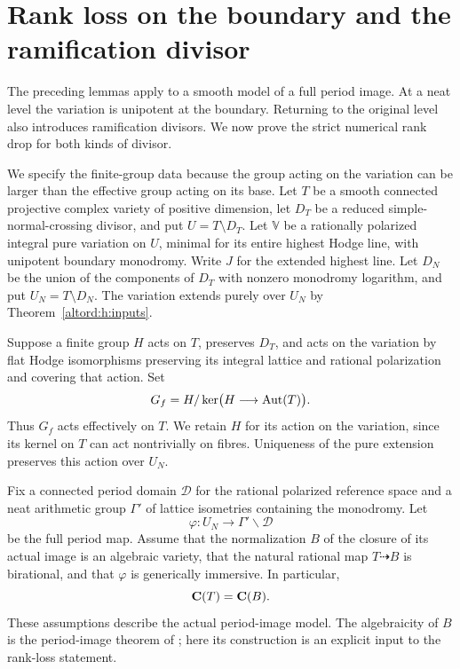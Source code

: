 \section{Rank loss on the boundary and the ramification divisor}
\label{sec:rankloss}

The preceding lemmas apply to a smooth model of a full period image.
At a neat level the variation is unipotent at the boundary. Returning
to the original level also introduces ramification divisors. We now
prove the strict numerical rank drop for both kinds of divisor.

We specify the finite-group data because the group acting on the
variation can be larger than the effective group acting on its base.
Let $T$ be a smooth connected projective complex variety of positive
dimension, let $D_T$ be a reduced simple-normal-crossing divisor, and
put $U=T\setminus D_T$. Let $\mathbb V$ be a rationally polarized
integral pure variation on $U$, minimal for its entire highest
Hodge line, with unipotent boundary monodromy. Write $J$ for the
extended highest line. Let $D_N$ be the union of the components
of $D_T$ with nonzero monodromy logarithm, and put
$U_N=T\setminus D_N$. The variation extends purely over $U_N$ by
Theorem~\ref{altord:h:inputs}.

Suppose a finite group $H$ acts on $T$, preserves $D_T$, and acts on
the variation by flat Hodge isomorphisms preserving its integral
lattice and rational polarization and covering that action. Set
\[
                 G_f=H/\ker\bigl(H\longrightarrow\operatorname{Aut}(T)\bigr).
\]
Thus $G_f$ acts effectively on $T$. We retain $H$ for its action on
the variation, since its kernel on $T$ can act nontrivially on fibres.
Uniqueness of the pure extension preserves this action over $U_N$.

Fix a connected period domain $\mathcal D$ for the rational
polarized reference space and a neat arithmetic group $\Gamma'$ of
lattice isometries containing the monodromy. Let
\[
                    \varphi:U_N\longrightarrow\Gamma'\backslash\mathcal D
\]
be the full period map. Assume that the normalization $B$ of the
closure of its actual image is an algebraic variety, that
the natural rational map $T\dashrightarrow B$ is birational, and
that $\varphi$ is generically immersive. In particular,
\[
                         \mathbf C(T)=\mathbf C(B).
\]
These assumptions describe the actual period-image model. The
algebraicity of $B$ is the period-image theorem of
\cite[Theorem~1.1]{BakkerBrunebarbeTsimerman}; here its construction
is an explicit input to the rank-loss statement.

